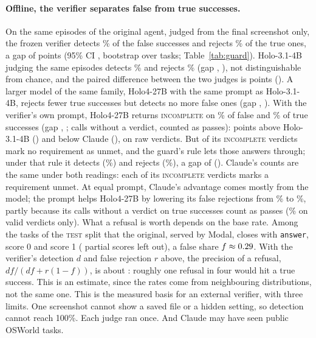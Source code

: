 \paragraph{Offline, the verifier separates false from true successes.} On the same \gbEpisodes{} episodes of the original agent, judged from the final screenshot only, the frozen verifier detects \gbClaudeDet\% of the false successes and rejects \gbClaudeRej\% of the true ones, a gap of \gbClaudeGap{} points (95\% CI \gbClaudeGapCi, bootstrap over \gbTasks{} tasks; Table~\ref{tab:guard}). Holo-3.1-4B judging the same episodes detects \gbHoloDet\% and rejects \gbHoloRej\% (gap \gbHoloGap, \gbHoloGapCi), not distinguishable from chance, and the paired difference between the two judges is \gbClaudeVsHolo{} points (\gbClaudeVsHoloCi). A larger model of the same family, Holo4-27B with the same prompt as Holo-3.1-4B, rejects fewer true successes but detects no more false ones (gap \gbHolofourGap, \gbHolofourGapCi). With the verifier's own prompt, Holo4-27B returns \textsc{incomplete} on \gbHolofourfeciDet\% of false and \gbHolofourfeciRej\% of true successes (gap \gbHolofourfeciGap, \gbHolofourfeciGapCi; \gbHolofourfeciNoVerdict{} calls without a verdict, counted as passes): \gbHolofourfeciVsHolo{} points above Holo-3.1-4B (\gbHolofourfeciVsHoloCi) and \gbHolofourfeciVsClaude{} below Claude (\gbHolofourfeciVsClaudeCi), on raw verdicts. But \gbHolofourruleDropped{} of its \gbHolofourruleRawInc{} \textsc{incomplete} verdicts mark no requirement as unmet, and the guard's rule lets those answers through; under that rule it detects \gbHolofourruleDetN{} (\gbHolofourruleDet\%) and rejects \gbHolofourruleRejN{} (\gbHolofourruleRej\%), a gap of \gbHolofourruleGap{} (\gbHolofourruleGapCi). Claude's counts are the same under both readings: each of its \textsc{incomplete} verdicts marks a requirement unmet. At equal prompt, Claude's advantage comes mostly from the model; the prompt helps Holo4-27B by lowering its false rejections from \gbHolofourRej\% to \gbHolofourfeciRej\%, partly because its \gbHolofourfeciNoVerdictTrue{} calls without a verdict on true successes count as passes (\gbHolofourfeciRejValid\% on valid verdicts only). What a refusal is worth depends on the base rate. Among the tasks of the \textsc{test} split that the original, served by Modal, closes with \texttt{answer}, \fgBaseFsDone{} score 0 and \fgBaseTrueDone{} score 1 (\fgBasePartialDone{} partial scores left out), a false share $f\approx0.29$. With the verifier's detection $d$ and false rejection $r$ above, the precision of a refusal, $df/(df+r(1-f))$, is about \fgPrecision: roughly one refusal in four would hit a true success. This is an estimate, since the rates come from neighbouring distributions, not the same one. %
This is the measured basis for an external verifier, with three limits. One screenshot cannot show a saved file or a hidden setting, so detection cannot reach 100\%. Each judge ran once. And Claude may have seen public OSWorld tasks. %

